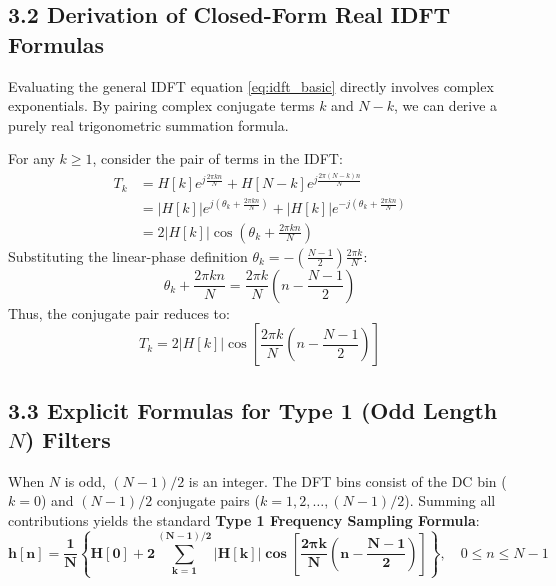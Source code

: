 \documentclass[11pt,a4paper]{article}
\begin{document}
\subsection{3.2 Derivation of Closed-Form Real IDFT Formulas}
Evaluating the general IDFT equation \eqref{eq:idft_basic} directly involves complex exponentials. By pairing complex conjugate terms $k$ and $N-k$, we can derive a purely real trigonometric summation formula.

For any $k \ge 1$, consider the pair of terms in the IDFT:
\begin{align}
T_k &= H[k] e^{j \frac{2\pi k n}{N}} + H[N-k] e^{j \frac{2\pi(N-k)n}{N}} \nonumber \\
    &= |H[k]| e^{j \left( \theta_k + \frac{2\pi k n}{N} \right)} + |H[k]| e^{-j \left( \theta_k + \frac{2\pi k n}{N} \right)} \nonumber \\
    &= 2 |H[k]| \cos\left( \theta_k + \frac{2\pi k n}{N} \right)
\end{align}
Substituting the linear-phase definition $\theta_k = -\left(\frac{N-1}{2}\right)\frac{2\pi k}{N}$:
\begin{equation}
\theta_k + \frac{2\pi k n}{N} = \frac{2\pi k}{N} \left( n - \frac{N-1}{2} \right)
\end{equation}
Thus, the conjugate pair reduces to:
\begin{equation}
T_k = 2 |H[k]| \cos\left[ \frac{2\pi k}{N} \left( n - \frac{N-1}{2} \right) \right]
\label{eq:cos_pair}
\end{equation}

\subsection{3.3 Explicit Formulas for Type 1 (Odd Length \texorpdfstring{$N$}{N}) Filters}
When $N$ is odd, $(N-1)/2$ is an integer. The DFT bins consist of the DC bin ($k=0$) and $(N-1)/2$ conjugate pairs ($k = 1, 2, \dots, (N-1)/2$). Summing all contributions yields the standard \textbf{Type 1 Frequency Sampling Formula}:
\begin{equation}
\mathbf{h[n] = \frac{1}{N} \left\{ H[0] + 2 \sum_{k=1}^{(N-1)/2} |H[k]| \cos\left[ \frac{2\pi k}{N} \left( n - \frac{N-1}{2} \right) \right] \right\}}, \quad 0 \le n \le N-1
\label{eq:type1_formula}
\end{equation}
\end{document}
